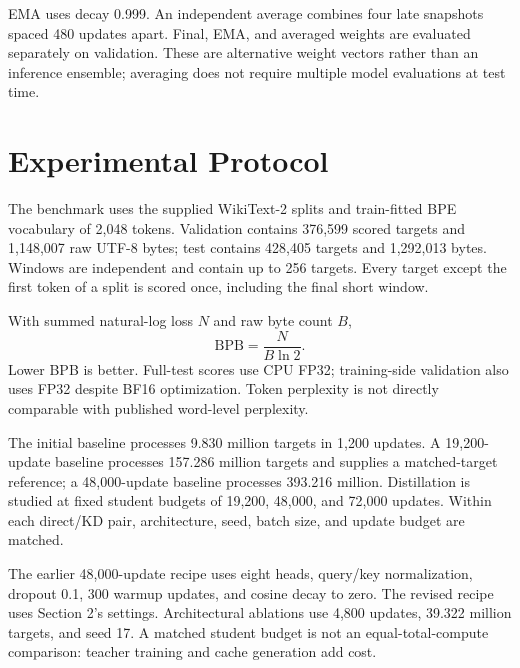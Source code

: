 \documentclass[10pt,twocolumn,letterpaper]{article}
\newcommand{\bpb}{\mathrm{BPB}}
\begin{document}
EMA uses decay 0.999. An independent average combines four late snapshots
spaced 480 updates apart. Final, EMA, and averaged weights are evaluated
separately on validation. These are alternative weight vectors rather than
an inference ensemble; averaging does not require multiple model evaluations
at test time.

\section{Experimental Protocol}
The benchmark uses the supplied WikiText-2 splits and train-fitted BPE vocabulary
of 2,048 tokens. Validation contains 376,599 scored targets and 1,148,007 raw
UTF-8 bytes; test contains 428,405 targets and 1,292,013 bytes. Windows are
independent and contain up to 256 targets. Every target except the first token
of a split is scored once, including the final short window.

With summed natural-log loss $N$ and raw byte count $B$,
\begin{equation}
\bpb=\frac{N}{B\ln 2}.
\end{equation}
Lower BPB is better. Full-test scores use CPU FP32; training-side validation
also uses FP32 despite BF16 optimization. Token perplexity is not directly
comparable with published word-level perplexity.

The initial baseline processes 9.830 million targets in 1,200 updates.
A 19,200-update baseline processes 157.286 million targets and supplies a
matched-target reference; a 48,000-update baseline processes 393.216 million.
Distillation is studied at fixed student budgets of 19,200, 48,000, and 72,000
updates. Within each direct/KD pair, architecture, seed, batch size, and update
budget are matched.

The earlier 48,000-update recipe uses eight heads, query/key normalization,
dropout 0.1, 300 warmup updates, and cosine decay to zero. The revised recipe
uses Section 2's settings. Architectural ablations use 4,800 updates,
39.322 million targets, and seed 17. A matched student budget is not an
equal-total-compute comparison: teacher training and cache generation add cost.
\end{document}
